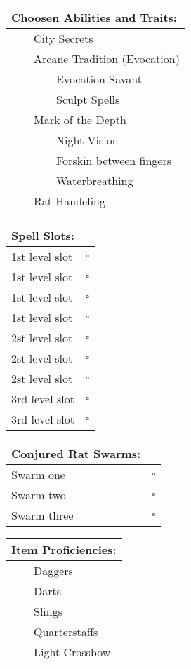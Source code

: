 \documentclass[11pt]{article}
\newcommand{\available}{$\square$}
\newcommand{\tabitem}{~~\llap{--}~~}
\newcommand{\tabtabitem}{~~~~~~\llap{$\bullet$}~~}
\begin{document}
\begin{multicols}{2}
\vspace{4mm}

\noindent \begin{tabularx}{95mm}{@{}l}
{\Large \textbf{Choosen Abilities and Traits:}} \\
\hline
\tabitem City Secrets \\
\tabitem Arcane Tradition (Evocation) \\
\tabtabitem Evocation Savant \\
\tabtabitem Sculpt Spells \\
\tabitem Mark of the Depth \\
\tabtabitem Night Vision \\
\tabtabitem Forskin between fingers \\
\tabtabitem Waterbreathing \\
\tabitem Rat Handeling
		\end{tabularx}

\vspace{4mm}

\noindent \begin{tabularx}{95mm}{@{}l c}
{\Large \textbf{Spell Slots:}} & \\
\hline
1st level slot & \available \\
1st level slot & \available \\
1st level slot & \available \\
1st level slot & \available \\
2st level slot & \available \\
2st level slot & \available \\
2st level slot & \available \\
3rd level slot & \available \\
3rd level slot & \available
		\end{tabularx}

\vspace{4mm}

\noindent \begin{tabularx}{95mm}{@{}l c}
{\Large \textbf{Conjured Rat Swarms:}} & \\
\hline
Swarm one & \available \\
Swarm two & \available \\
Swarm three & \available
		\end{tabularx}

\vspace{4mm}

\noindent \begin{tabularx}{95mm}{@{}l}
{\Large \textbf{Item Proficiencies:}} \\
\hline
\tabitem Daggers \\
\tabitem Darts \\
\tabitem Slings \\
\tabitem Quarterstaffs \\
\tabitem Light Crossbow
		\end{tabularx}
	\end{multicols}
	
\end{document}
